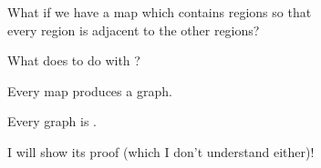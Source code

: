 \begin{frame}{}
  \begin{center}
    What if we have a map which contains  regions so that \\[5pt]
    every region is adjacent to the other  regions?
  \end{center}

  \pause
\end{frame}

\begin{frame}{}
  \begin{center}
    What does  to do with ?
  \end{center}

\end{frame}

\begin{frame}{}

  \pause
  \vspace{0.40cm}
  \begin{center}
    Every map produces a  graph.
  \end{center}
\end{frame}

\begin{frame}{}
  \begin{theorem}
    Every   graph is .
  \end{theorem}


  \pause
  \begin{center}
    I will  show its proof (which I don't understand either)!
  \end{center}
\end{frame}

